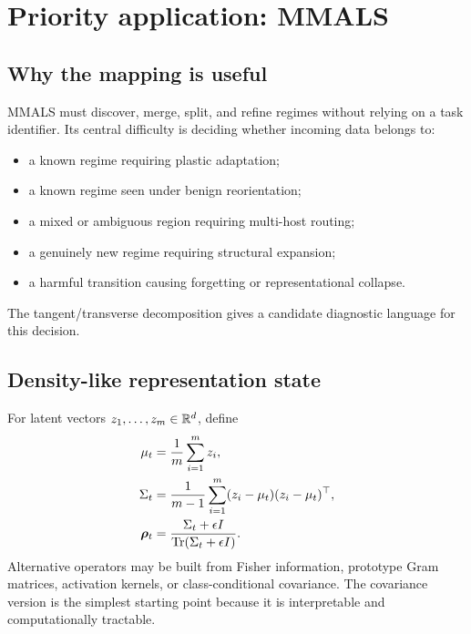 \section{Priority application: MMALS}

\subsection{Why the mapping is useful}

MMALS must discover, merge, split, and refine regimes without relying on a task identifier. Its central difficulty is deciding whether incoming data belongs to:

\begin{itemize}
  \item a known regime requiring plastic adaptation;
  \item a known regime seen under benign reorientation;
  \item a mixed or ambiguous region requiring multi-host routing;
  \item a genuinely new regime requiring structural expansion;
  \item a harmful transition causing forgetting or representational collapse.
\end{itemize}

The tangent/transverse decomposition gives a candidate diagnostic language for this decision.

\subsection{Density-like representation state}

For latent vectors $z_1,\ldots,z_m\in\mathbb{R}^d$, define
\begin{align}
\mu_t &= \frac1m\sum_{i=1}^m z_i,\\
\Sigma_t &= \frac{1}{m-1}\sum_{i=1}^m(z_i-\mu_t)(z_i-\mu_t)^\top,\\
\bm{\rho}_t &= \frac{\Sigma_t+\epsilon I}{\operatorname{Tr}(\Sigma_t+\epsilon I)}.
\label{eq:mmals_density}
\end{align}
Alternative operators may be built from Fisher information, prototype Gram matrices, activation kernels, or class-conditional covariance. The covariance version is the simplest starting point because it is interpretable and computationally tractable.

